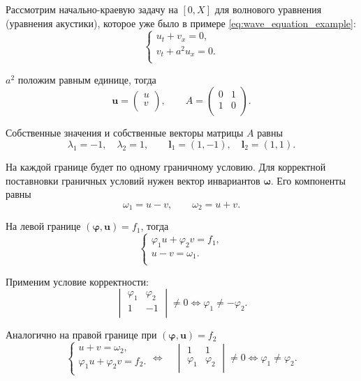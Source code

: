 \documentclass[../main.tex]{subfile}
\begin{document}
\begin{example}
	Рассмотрим начально-краевую задачу на $[0,X]$ для волнового уравнения
	(уравнения акустики), которое уже было в примере
	\eqref{eq:wave_equation_example}:
	\[\begin{cases}
		u_t+v_x=0, \\
		v_t+a^2u_x=0. \\
	\end{cases}\]

	$a^2$ положим равным единице, тогда
	\[\boldsymbol{u}=
		\begin{pmatrix}
			u \\
			v \\
		\end{pmatrix},
	\qquad
	A=
		\begin{pmatrix}
			0 & 1 \\
			1 & 0 \\
		\end{pmatrix}.
	\]

	Собственные значения и собственные векторы матрицы $A$ равны
	\[\lambda_1=-1,\quad \lambda_2=1,\qquad
	\boldsymbol{l}_1=(1,-1),\quad \boldsymbol{l}_2=(1,1).\]

	На каждой границе будет по одному граничному условию. Для корректной
	поставновки граничных условий нужен вектор инвариантов
	$\boldsymbol\omega$. Его компоненты равны
	\[\omega_1=u-v,\qquad \omega_2=u+v.\]

	На левой границе $(\boldsymbol\varphi,\boldsymbol u)=f_1$, тогда
	\[
		\begin{cases}
			\varphi_1 u+\varphi_2 v=f_1, \\
			u-v=\omega_1. \\
		\end{cases}
	\]

	Применим условие корректности:
	\[
		\begin{vmatrix}
			\varphi_1 & \varphi_2 \\
			1	& -1	\\
		\end{vmatrix}
		\ne 0\Leftrightarrow
		\varphi_1\ne -\varphi_2.
	\]

	Аналогично на правой границе при $(\boldsymbol\varphi,\boldsymbol u)=
	f_2$
	\[
		\begin{cases}
			u+v=\omega_2, \\
			\varphi_1 u+\varphi_2 v=f_2. \\
		\end{cases}
		\Leftrightarrow\quad
		\begin{vmatrix}
			1	& 1	\\
			\varphi_1 & \varphi_2 \\
		\end{vmatrix}
		\ne 0\Leftrightarrow
		\varphi_1\ne \varphi_2.
	\]
\end{example}
\end{document}
